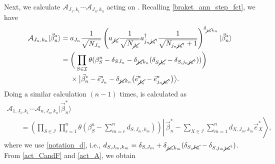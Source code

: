 \documentclass[10pt,a4paper]{amsart}
\numberwithin{equation}{section}
\begin{document}
Next, we calculate
$
\mathcal{A}_{
J_{1},
k_{1}
}
\cdots
\mathcal{A}_{
J_{n},
k_{n}
}
$
acting on
.
Recalling \eqref{braket_ann_step_fct}, we have
\begin{align*} %
 \mathcal{A}_{ J_{n}, k_{n} }
|
 \vec{\beta}_{n}^{\ast}
\rangle
 ={}&
 a_{J_{n}}
 \frac{1}{\sqrt{N_{J_{n}}}}
 \left(
 a_{\cancel{J_{n}}}
 \frac{1}{
 \sqrt{
 N_{\cancel{J_{n}}}
 }
 }
 a_{j_{n}\cancel{j_{n}}'}^{\dagger}
 \frac{1}{
 \sqrt{
 N_{j_{n}\cancel{j_{n}}'}+1
 }
 }
 \right)^{\delta_{\cancel{j_{n}}k_{n}}}
|
 \vec{\beta}_{n}^{\ast}
\rangle
 \\
 ={}&
 \bigg(
 \prod_{
 S
 \in
 \mathcal{I}
 }
 \theta
 (
 \beta_{S}^{n}
 -
 \delta_{SJ_{n}}
 -
 \delta_{\cancel{j_{n}}k_{n}}
 (
 \delta_{S\cancel{J_{n}}}
 -
 \delta_{S,j_{n}\cancel{j_{n}}'}
 )
 )
 \bigg)\\
&\times
 \big|
 \vec{\beta}_{n}^{\ast}
 -
 \vec{e}_{J_{n}}^{\ast}
 -
 \delta_{\cancel{j_{n}}k_{n}}
 \bigl(
 \vec{e}_{\cancel{J_{n}}}^{\ast}
 -
 \vec{e}_{j_{n}\cancel{j_{n}}'}^{\ast}
 \bigr)
 \big\rangle
 .
\end{align*}
Doing a similar calculation $(n-1)$ times,
is calculated as
\begin{gather}
 \mathcal{A}_{
 1,
 J_{1},
 k_{1}
 }
 \cdots
 \mathcal{A}_{
 n,
 J_{n},
 k_{n}
 }
|
 \vec{\beta}_{n}^{\ast}
\rangle\nonumber\\
 \qquad
 =
 \left(
 \prod_{
 S
 \in
 \mathcal{I}
 }
 \prod_{r=1}^{n}
 \theta
 \left(
 \beta_{S}^{n}
 -
 \sum_{m=r}^{n}
 d_{
 S,
 J_{m},
 k_{m}
 }
 \right)
 \right)
 \left|\,
 \vec{\beta}_{n}^{\ast}
 -
 \sum_{
 X
 \in
 \mathcal{I}
 }
 \sum_{m=1}^{n}
 d_{
 X,
 J_{m},
 k_{m}
 }
 \vec{e}_{X}^{\ast}
 \right\rangle
 ,
 \label{act_A}
\end{gather}
where we use \eqref{notation_d}, i.e.,
$
d_{
 S,
 J_{m},
 k_{m}
}
=
\delta_{
 S,
 J_{m}
}
+
\delta_{\cancel{j_{m}}k_{m}}
 (
 \delta_{
 S,
 \cancel{J_{m}}
 }
 -
 \delta_{
 S,
 j_{m}\cancel{j_{m}}'
 }
 )
$.
From \eqref{act_CandF} and \eqref{act_A}, we obtain
\end{document}
